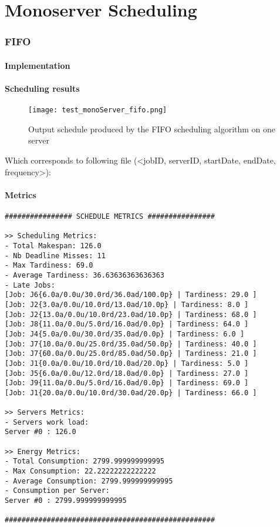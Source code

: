 \documentclass[./report.tex]{subfiles}
\begin{document}
\part{Monoserver Scheduling}

\section{FIFO}
\subsection{Implementation}

\subsection{Scheduling results}
\begin{figure}[!h]
	\center
	\texttt{[image: test\_monoServer\_fifo.png]}
	\caption{Output schedule produced by the FIFO scheduling algorithm on one server}
	\label{fig:monoServer_fifo} 
\end{figure}

Which corresponds to following file (<jobID, serverID, startDate, endDate, frequency>):


\newpage
\subsection{Metrics}
\begin{lstlisting}[style=txt, caption={Metrics for FIFO on a single server}]
################ SCHEDULE METRICS ################

>> Scheduling Metrics: 
- Total Makespan: 126.0
- Nb Deadline Misses: 11
- Max Tardiness: 69.0
- Average Tardiness: 36.63636363636363
- Late Jobs: 
[Job: J6{6.0a/0.0u/30.0rd/36.0ad/100.0p} | Tardiness: 29.0 ]
[Job: J2{3.0a/0.0u/10.0rd/13.0ad/10.0p} | Tardiness: 8.0 ]
[Job: J2{13.0a/0.0u/10.0rd/23.0ad/10.0p} | Tardiness: 68.0 ]
[Job: J8{11.0a/0.0u/5.0rd/16.0ad/0.0p} | Tardiness: 64.0 ]
[Job: J4{5.0a/0.0u/30.0rd/35.0ad/0.0p} | Tardiness: 6.0 ]
[Job: J7{10.0a/0.0u/25.0rd/35.0ad/50.0p} | Tardiness: 40.0 ]
[Job: J7{60.0a/0.0u/25.0rd/85.0ad/50.0p} | Tardiness: 21.0 ]
[Job: J1{0.0a/0.0u/10.0rd/10.0ad/20.0p} | Tardiness: 5.0 ]
[Job: J5{6.0a/0.0u/12.0rd/18.0ad/0.0p} | Tardiness: 27.0 ]
[Job: J9{11.0a/0.0u/5.0rd/16.0ad/0.0p} | Tardiness: 69.0 ]
[Job: J1{20.0a/0.0u/10.0rd/30.0ad/20.0p} | Tardiness: 66.0 ]

>> Servers Metrics: 
- Servers work load:
Server #0 : 126.0

>> Energy Metrics: 
- Total Consumption: 2799.999999999995
- Max Consumption: 22.22222222222222
- Average Consumption: 2799.999999999995
- Consumption per Server: 
Server #0 : 2799.999999999995

##################################################
\end{lstlisting}
\end{document}
